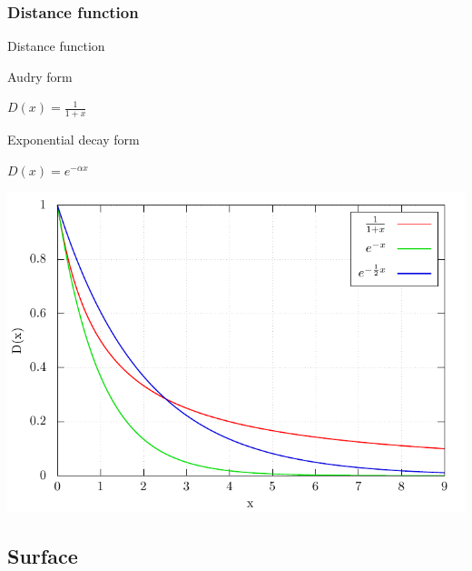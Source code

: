 \documentclass{beamer}
\begin{document}
\subsubsection{Distance function}
\begin{frame}{Distance function}
    \centering
    \begin{minipage}[t]{0.48\linewidth}
        \centering
        \color{red} Audry form
        \begin{tcolorbox}[width=0.85\linewidth, colback=red!20, colframe=red]
            $D\left(x\right)=\frac{1}{1+x}$
        \end{tcolorbox}
    \end{minipage}
    \begin{minipage}[t]{0.48\linewidth}
        \centering
        \color{blue} Exponential decay form
        \begin{tcolorbox}[width=0.85\linewidth, colback=blue!20, colframe=blue]
            $D\left(x\right)=e^{-\alpha x}$
        \end{tcolorbox}
    \end{minipage}
    \includegraphics[scale=0.65]{dist_funcs.pdf}    
\end{frame}

\subsection{Surface}
\end{document}
